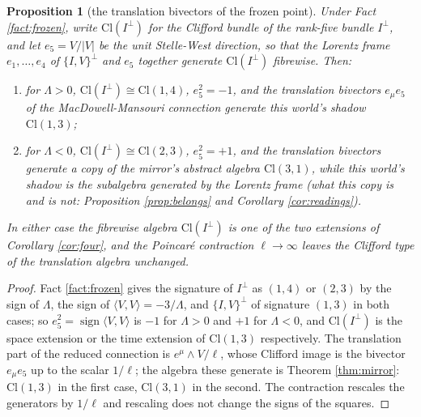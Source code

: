 \documentclass[11pt]{article}
\newtheorem{proposition}[theorem]{Proposition}
\theoremstyle{definition}
\newcommand{\Cl}{\mathrm{Cl}}
\newcommand{\ip}[2]{\langle #1, #2\rangle}
\begin{document}
\begin{proposition}[the translation bivectors of the frozen point]\label{prop:momenta}
Under Fact \ref{fact:frozen}, write $\Cl(I^{\perp})$ for the Clifford bundle of the rank-five bundle $I^{\perp}$, and let $e_{5} = V/|V|$ be the unit Stelle-West direction, so that the Lorentz frame $e_{1}, \ldots, e_{4}$ of $\{I,V\}^{\perp}$ and $e_{5}$ together generate $\Cl(I^{\perp})$ fibrewise. Then:
\begin{enumerate}
\item[(i)] for $\Lambda > 0$, $\Cl(I^{\perp}) \cong \Cl(1,4)$, $e_{5}^{2} = -1$, and the translation bivectors $e_{\mu}e_{5}$ of the MacDowell-Mansouri connection generate this world's shadow $\Cl(1,3)$;
\item[(ii)] for $\Lambda < 0$, $\Cl(I^{\perp}) \cong \Cl(2,3)$, $e_{5}^{2} = +1$, and the translation bivectors generate a copy of the mirror's abstract algebra $\Cl(3,1)$, while this world's shadow is the subalgebra generated by the Lorentz frame (what this copy is and is not: Proposition \ref{prop:belongs} and Corollary \ref{cor:readings}).
\end{enumerate}
In either case the fibrewise algebra $\Cl(I^{\perp})$ is one of the two extensions of Corollary \ref{cor:four}, and the Poincar\'e contraction $\ell \to \infty$ leaves the Clifford type of the translation algebra unchanged.
\end{proposition}

\begin{proof}
Fact \ref{fact:frozen} gives the signature of $I^{\perp}$ as $(1,4)$ or $(2,3)$ by the sign of $\Lambda$, the sign of $\ip{V}{V} = -3/\Lambda$, and $\{I,V\}^{\perp}$ of signature $(1,3)$ in both cases; so $e_{5}^{2} = \operatorname{sign}\ip{V}{V}$ is $-1$ for $\Lambda > 0$ and $+1$ for $\Lambda < 0$, and $\Cl(I^{\perp})$ is the space extension or the time extension of $\Cl(1,3)$ respectively. The translation part of the reduced connection is $e^{\mu}\wedge V/\ell$, whose Clifford image is the bivector $e_{\mu}e_{5}$ up to the scalar $1/\ell$; the algebra these generate is Theorem \ref{thm:mirror}: $\Cl(1,3)$ in the first case, $\Cl(3,1)$ in the second. The contraction rescales the generators by $1/\ell$ and rescaling does not change the signs of the squares.
\end{proof}
\end{document}
